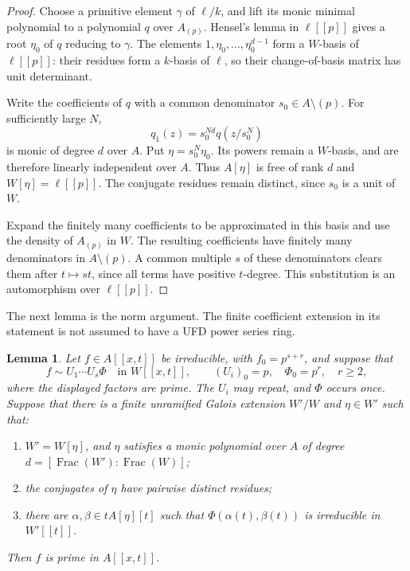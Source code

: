 \documentclass[11pt]{amsart}
\newtheorem{lemma}[theorem]{Lemma}
\theoremstyle{remark}
\DeclareMathOperator{\Frac}{Frac}
\begin{document}
\begin{proof}
Choose a primitive element $\gamma$ of $\ell/k$, and lift its
monic minimal polynomial to a polynomial $q$ over $A_{(p)}$.
Hensel's lemma in $\ell[[p]]$ gives a root $\eta_0$ of $q$
reducing to $\gamma$. The elements
$1,\eta_0,\ldots,\eta_0^{d-1}$ form a $W$-basis of $\ell[[p]]$:
their residues form a $k$-basis of $\ell$, so their change-of-basis
matrix has unit determinant.

Write the coefficients of $q$ with a common denominator
$s_0\in A\setminus(p)$. For sufficiently large $N$,
\[
 q_1(z)=s_0^{Nd}q(z/s_0^N)
\]
is monic of degree $d$ over $A$. Put $\eta=s_0^N\eta_0$.
Its powers remain a $W$-basis, and are therefore linearly independent
over $A$. Thus $A[\eta]$ is free of rank $d$ and
$W[\eta]=\ell[[p]]$. The conjugate residues remain distinct,
since $s_0$ is a unit of $W$.

Expand the finitely many coefficients to be approximated in this
basis and use the density of $A_{(p)}$ in $W$. The resulting
coefficients have finitely many denominators in $A\setminus(p)$.
A common multiple $s$ of these denominators clears them after
$t\mapsto st$, since all terms have positive $t$-degree. This
substitution is an automorphism over $\ell[[p]]$.
\end{proof}

The next lemma is the norm argument. The finite coefficient
extension in its statement is not assumed to have a UFD power
series ring.

\begin{lemma}\label{thm:norm}
Let $f\in A[[x,t]]$ be irreducible, with $f_0=p^{s+r}$, and
suppose that
\[
 f\sim U_1\cdots U_s\Phi\quad\text{in }W[[x,t]],\qquad
 (U_i)_0=p,\quad\Phi_0=p^r,\quad r\geq2,
\]
where the displayed factors are prime. The $U_i$ may repeat, and
$\Phi$ occurs once. Suppose that there is a finite unramified
Galois extension $W'/W$ and $\eta\in W'$ such that:
\begin{enumerate}
\item $W'=W[\eta]$, and $\eta$ satisfies a monic polynomial over
      $A$ of degree $d=[\Frac(W'):\Frac(W)]$;
\item the conjugates of $\eta$ have pairwise distinct residues;
\item there are $\alpha,\beta\in tA[\eta][t]$ such that
      $\Phi(\alpha(t),\beta(t))$ is irreducible in $W'[[t]]$.
\end{enumerate}
Then $f$ is prime in $A[[x,t]]$.
\end{lemma}
\end{document}
